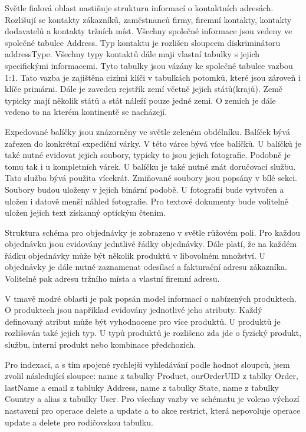 \documentclass[thesis=B,czech]{FITthesis}[2012/06/26]
\begin{document}
	Světle fialová oblast nastiňuje strukturu informací o kontaktních adresách. Rozlišují se kontakty zákazníků, zaměstnanců firmy, firemní kontakty, kontakty dodavatelů a kontakty tržních míst. Všechny společné informace jsou vedeny ve společné tabulce Address. Typ kontaktu je rozlišen sloupcem diskriminátoru addressType. Všechny typy kontaktů dále maji vlastní tabulky s jejich specifickými informacemi. Tyto tabulky jsou vázány ke společné tabulce vazbou 1:1. Tato vazba je zajištěna cizími klíči v tabulkách potomků, které jsou zároveň i klíče primárni. Dále je zaveden rejstřík zemí včetně jejich států(krajů). Země typicky mají několik států a stát náleží pouze jedné zemi. O zemích je dále vedeno to na kterém kontinentě se nacházejí.
	
	Expedované balíčky jsou znázorněny ve světle zeleném obdélníku. Balíček bývá zařezen do konkrétní expediční várky. V této várce bývá více balíčků. U balíčků je také nutné evidovat jejich soubory, typicky to jsou jejich fotografie. Podobně je tomu tak i u kompletních várek. U balíčku je také nutné znát doručovací službu. Tato služba bývá použita vícekrát. Zmiňované soubory jsou popsány v bílé sekci. Soubory budou uloženy v jejich binární podobě. U fotografií bude vytvořen a uložen i datově menší náhled fotografie. Pro textové dokumenty bude volitelně uložen jejich text získanný optickým čtením.

	Struktura schéma pro objednávky je zobrazeno v světle růžovém poli. Pro každou objednávku jsou evidovány jedntlivé řádky objednávky. Dále platí, že na každém řádku objednávky může být několik produktů v libovolném množství. U objednávky je dále nutné zaznamenat odesílací a fakturační adresu zákazníka. Volitelně pak adresu tržního místa a vlastní firemní adresu.
	
	V tmavě modré oblasti je pak popsán model informací o nabízených produktech. O produktech jsou například evidovány jednotlivé jeho atributy. Každý definovaný atribut může být vyhodnocene pro více produktů. U produktů je rozlišován také jejich typ. U typů produktů je rozlišeno zda jde o fyzický produkt, službu, interní produkt nebo kombinace předchozích.
	
	Pro indexaci, a s tím spojené rychlejší vyhledávání podle hodnot sloupců, jsem zvolil následující sloupce: name z tabulky Product, ourOrderUID z tablky Order, lastName a email z tabluky Address, name z tabulky State, name z tabulky Country a alias z tabulky User. Pro všechny vazby ve schématu je voleno výchozí nastavení pro operace delete a update a to akce restrict, která nepovoluje operace update a delete pro rodičovskou tabulku.
	
\end{document}
